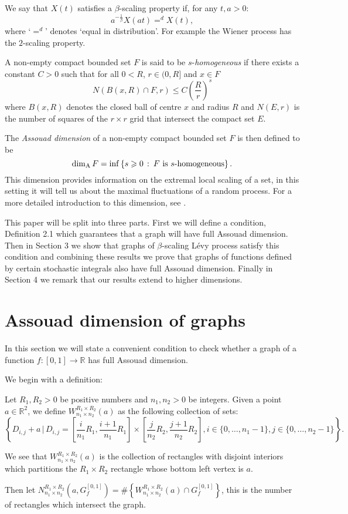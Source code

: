 We say that $X(t)$ satisfies a $\beta$-scaling property if, for any $t,a>0$:
\[
a^{-\frac{1}{\beta}}X(at)=^d X(t),
\]
where `$=^d$' denotes `equal in distribution'.
For example the Wiener process has the $2$-scaling property.

A non-empty compact bounded set $F$ is said to be $s$-\textit{homogeneous} if there exists a constant $C>0$ such that for all $0<R$, $r\in (0,R]$ and $x\in F$
\[
N(B(x,R) \cap F, r) \le C\left(\frac{R}{r}\right)^s
\]
where $B(x,R)$ denotes the closed ball of centre $x$ and radius $R$ and $N(E,r)$ is the number of squares of the $r\times r$ grid that intersect the compact set $E$. 

The \emph{Assouad dimension} of a non-empty compact bounded set $F$ is then defined to be 
\[
\dim_{\mathrm{A}} F = \inf \left\{ s \geqslant 0 \, \, \colon \, F \text{ is } s\text{-homogeneous} \right\}.
\]
This dimension provides information on the extremal local scaling of a set, in this setting it will tell us about the maximal fluctuations of a random process. For a more detailed introduction to this dimension, see \cite{Fr, Ro}. 

This paper will be split into three parts. First we will define a condition, Definition 2.1 which guarantees that a graph will have full Assouad dimension. Then in Section 3 we show that graphs of $\beta$-scaling L\'evy process satisfy this condition and combining these results we prove that graphs of functions defined by certain stochastic integrals also have full Assouad dimension. Finally in Section 4 we remark that our results extend to higher dimensions.

\section{Assouad dimension of graphs}
In this section we will state a convenient condition to check whether a graph of a function $f:[0,1]\to\mathbb{R}$ has full Assouad dimension.

We begin with a definition:

\begin{defn}\label{Win}
	Let $R_1,R_2>0$ be positive numbers and $n_1,n_2>0$ be integers. Given a point $a\in\mathbb{R}^2$, we define $W_{n_1\times n_2}^{R_1\times R_2}(a)$ as the following collection of sets:
	\[	
	\left\{D_{i,j}+a \, \vert \, D_{i,j}=\left[\frac{i}{n_1}R_1,\frac{i+1}{n_1}R_1\right]\times \left[\frac{j}{n_2}R_2,\frac{j+1}{n_2}R_2\right], i\in\{0,\dots,n_1-1\}, j\in\{0,\dots,n_2-1\}\right\}.
	\]
	
	We see that $W_{n_1\times n_2}^{R_1\times R_2}(a)$ is the collection of rectangles with disjoint interiors which partitions the $R_1\times R_2$ rectangle whose bottom left vertex is $a$.
	
	Then let $N_{n_1\times n_2}^{R_1 \times R_2 }(a,G_f^{[0,1]})= \# \left\{ W_{n_1\times n_2}^{R_1\times R_2}(a) \cap G_f^{[0,1]} \right\}$, this is the number of rectangles which intersect the graph.
\end{defn}

